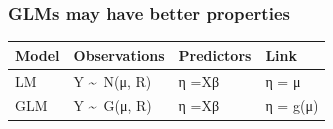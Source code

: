 \documentclass[
	12pt
	]{beamer}
\begin{document}
% 	


\begin{frame}[t]
\frametitle{GLMs may have better properties}
\begin{tabular}{llll}
\textbf{Model} & \textbf{Observations} & \textbf{Predictors} & \textbf{Link} \\ \hline
LM & Y \textasciitilde~N(μ, R) & η =Xβ & η = μ \\ \pause
\alert{GLM} & Y \textasciitilde~\alert{G}(μ, R) & η =Xβ & η = \alert{g(}μ\alert{)} \\ 
\end{tabular}
\vspace*{0.5em}
\pause
\setlength{\fboxsep}{1pt}
 \\[0.5em]

\end{frame}
\end{document}
